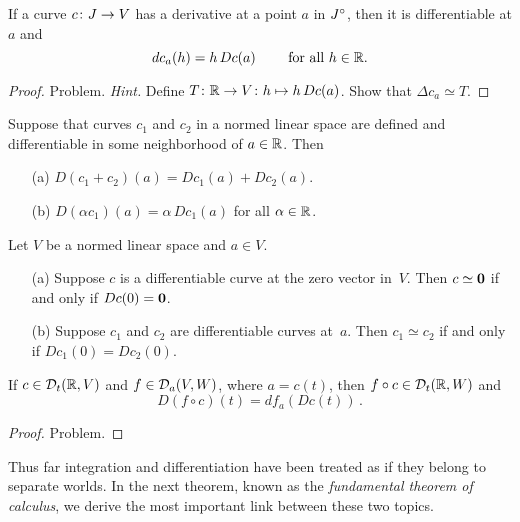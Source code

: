 \begin{prop}\label{prop_der_diff} If a curve $c\colon J \rightarrow V$ has a derivative at a point $a$
in $J^{\circ}$, then it is differentiable at $a$ and
  \[ dc_a(h) = h\,Dc(a) \qquad \text{ for all $h \in \mathbb{R}$}. \]
\end{prop}

\begin{proof} Problem.  \emph{Hint.}  Define $T \colon \mathbb{R} \rightarrow V\colon  h \mapsto h\,Dc(a)$.
Show that $\Delta c_a \simeq T$.  \ns
\end{proof}

\begin{prob} Suppose that curves $c_1$ and $c_2$ in a normed linear space are defined and
differentiable in some neighborhood of $a \in \mathbb{R}$.  Then
 \begin{enumerate}
  \item[(a)] $D(c_1 + c_2)(a) = Dc_1(a) + Dc_2(a)$.
  \item[(b)] $D(\alpha c_1)(a) = \alpha\,Dc_1(a)$ for all $\alpha \in \mathbb{R}$.
 \end{enumerate}
\end{prob}

\begin{prob}\label{prob_nasc_tan_curves} Let $V$ be a normed linear space and $a \in V$.
 \begin{enumerate}
  \item[(a)] Suppose $c$ is a differentiable curve at the zero vector in~$V$.  Then $c \simeq \mathbf{0}$
if and only if $Dc(0) = \mathbf{0}$.
  \item[(b)] Suppose $c_1$ and $c_2$ are differentiable curves at~$a$.  Then $c_1 \simeq c_2$ if
and only if $Dc_1(0) = Dc_2(0)$.
 \end{enumerate}
\end{prob}

\begin{prop}\label{prob_der_curv1} If $c \in \mathcal{D}_t(\mathbb{R}, V)$ and $f \in \mathcal{D}_a(V,W)$, where
$a = c(t)$, then $f \circ c \in \mathcal{D}_t(\mathbb{R},W)$ and
  \[ D(f \circ c)(t) = df_a(Dc(t))\,. \]
\end{prop}

\begin{proof} Problem.  \ns  \end{proof}

Thus far integration and differentiation have been treated as if they belong to separate
worlds. In the next theorem, known as the \emph{fundamental theorem of calculus}, we derive
the most important link between these two topics.

